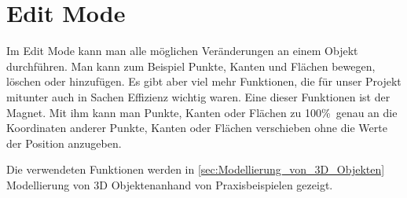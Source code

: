 \section{Edit Mode}
Im Edit Mode kann man alle möglichen Veränderungen an einem Objekt durchführen. Man kann zum Beispiel Punkte, Kanten und Flächen bewegen, löschen oder hinzufügen.
Es gibt aber viel mehr Funktionen, die für unser Projekt mitunter auch in Sachen Effizienz wichtig waren. Eine dieser Funktionen ist der Magnet. Mit ihm kann man Punkte, Kanten oder Flächen zu 100\%\ genau an
die Koordinaten anderer Punkte, Kanten oder Flächen verschieben ohne die Werte der Position anzugeben.

Die verwendeten Funktionen werden in  \autoref{sec:Modellierung_von_3D_Objekten} \dq  Modellierung von 3D Objekten\dq anhand von
Praxisbeispielen gezeigt.
